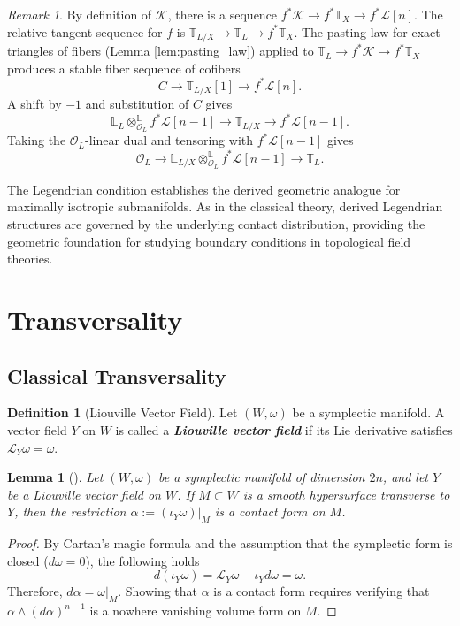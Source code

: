 \documentclass[reqno]{amsart}
\newtheorem{lemma}[theorem]{Lemma}
\theoremstyle{definition}
\newtheorem{definition}[theorem]{Definition}
\theoremstyle{remark}
\newtheorem{remark}[theorem]{Remark}
\newcommand{\LL}{\mathbb{L}}
\newcommand{\TT}{\mathbb{T}}
\newcommand{\cO}{\mathcal{O}}
\newcommand{\cL}{\mathcal{L}}
\newcommand{\cK}{\mathcal{K}}
\newcommand{\bfem}[1]{\textbf{\textit{#1}}}
\begin{document}
{\begin{remark}
  By definition of $\cK$, there is a sequence $f^*\cK \to f^*\TT_X \to f^*\cL[n]$. The relative tangent sequence for $f$ is $\TT_{L/X} \to \TT_L \to f^*\TT_X$.
  The pasting law for exact triangles of fibers (Lemma \ref{lem:pasting_law}) applied to $\TT_L \to f^*\cK \to f^*\TT_X$ produces a stable fiber sequence of cofibers
  \begin{equation*}
    C \to \TT_{L/X}[1] \to f^*\cL[n].
  \end{equation*}
  A shift by $-1$ and substitution of $C$ gives
  \begin{equation*}
    \LL_L \otimes^{\mathbb{L}}_{\cO_L} f^*\cL[n-1] \to \TT_{L/X} \to f^*\cL[n-1].
  \end{equation*}
  Taking the $\cO_L$-linear dual and tensoring with $f^*\cL[n-1]$ gives
  \begin{equation*}
    \cO_L \to \LL_{L/X} \otimes^{\mathbb{L}}_{\cO_L} f^*\cL[n-1] \to \TT_L.
  \end{equation*}
\end{remark}

The Legendrian condition establishes the derived geometric analogue
for maximally isotropic submanifolds. As in the classical
theory, derived Legendrian structures are governed by the
underlying contact distribution, providing the geometric foundation
for studying boundary conditions in topological field theories.
\section{Transversality}
\subsection{Classical Transversality} \label{sec:classical}

\begin{definition}[Liouville Vector Field]
  Let $(W, \omega)$ be a symplectic manifold. A vector field $Y$ on
  $W$ is called a \bfem{Liouville vector field} if its Lie
  derivative satisfies $\mathcal{L}_Y \omega = \omega$.
\end{definition}

\begin{lemma}[{\cite[Lemma 1.4.5]{Geiges}}] \label{lem:classical_geiges}
  Let $(W, \omega)$ be a symplectic manifold of dimension $2n$, and
  let $Y$ be a Liouville vector field on $W$. If $M \subset W$ is a
  smooth hypersurface transverse to $Y$, then the restriction $\alpha
  := (\iota_Y \omega)|_M$ is a contact form on $M$.
\end{lemma}
\begin{proof}
  By Cartan's magic formula and the assumption that the symplectic
  form is closed ($d\omega = 0$), the following holds
  \begin{equation*}
    d(\iota_Y \omega) = \mathcal{L}_Y \omega - \iota_Y d\omega = \omega.
  \end{equation*}
  Therefore, $d\alpha = \omega|_M$. Showing that $\alpha$ is a
  contact form requires verifying that $\alpha \wedge (d\alpha)^{n-1}$
  is a nowhere vanishing volume form on $M$.


\end{proof}}
\end{document}
